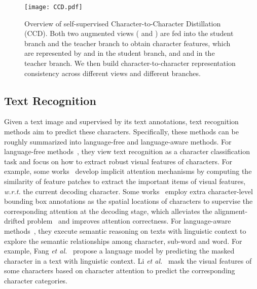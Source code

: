 \documentclass[10pt,twocolumn,letterpaper]{article}
\begin{document}
\begin{figure*}[t]
  \centering
  \graphicspath{{./graph/}}
  \texttt{[image: CCD.pdf]}
  \caption{Overview of self-supervised Character-to-Character Distillation (CCD). Both two augmented views ( and ) are fed into the student branch and the teacher branch to obtain character features, which are represented by  and  in the student branch, and  and  in the teacher branch. We then build character-to-character representation consistency across different views and different branches.
  }
  \label{Figs.Network}
  \vspace{-1.3em}
\end{figure*}
\subsection{Text Recognition}
Given a text image and supervised by its text annotations, text recognition methods aim to predict these characters. Specifically, these methods can be roughly summarized into language-free and language-aware methods. For language-free methods~\cite{CRNN:shi2016end,PIMNet,SAR:li2019show,SATRN:lee2020recognizing,zhong2022sgbanet,wan2020textscanner,liao2019scene,Masktextspotter,Bhunia_2021_ICCV, bhunia2021metahtr,xie2022understanding}, they view text recognition as a character classification task and focus on how to extract robust visual features of characters. For example, some works~\cite{CRNN:shi2016end,PIMNet,SAR:li2019show,SATRN:lee2020recognizing,SCATTER:litman2020scatter,zhong2022sgbanet,ScRN:yang2019symmetry} develop implicit attention mechanisms by computing the similarity of feature patches to extract the important items of visual features, \emph{w.r.t.} the current decoding character. Some works~\cite{wan2020textscanner,liao2019scene,Masktextspotter} employ extra character-level bounding box annotations as the spatial locations of characters to supervise the corresponding attention at the decoding stage, which alleviates the alignment-drifted problem~\cite{robustscanner} and improves attention correctness. For language-aware methods~\cite{ABINET:fang2021read,bhunia2021joint,visionLAN,SRN:yu2020towards}, they execute semantic reasoning on texts with linguistic context to explore the semantic relationships among character, sub-word and word. For example, Fang \emph{et al.}~\cite{ABINET:fang2021read} propose a language model by predicting the masked character in a text with linguistic context. 
Li \emph{et al.}~\cite{visionLAN} mask the visual features of some characters based on character attention to predict the corresponding character categories. 
\end{document}
